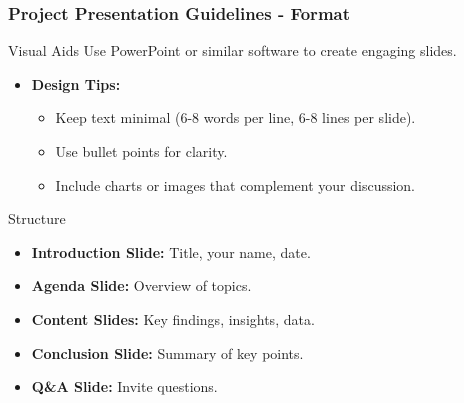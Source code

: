 \documentclass[aspectratio=169]{beamer}
\begin{document}
\begin{frame}[fragile]
    \frametitle{Project Presentation Guidelines - Format}
    \begin{block}{Visual Aids}
        Use PowerPoint or similar software to create engaging slides.
        \begin{itemize}
            \item \textbf{Design Tips:}
                \begin{itemize}
                    \item Keep text minimal (6-8 words per line, 6-8 lines per slide).
                    \item Use bullet points for clarity.
                    \item Include charts or images that complement your discussion.
                \end{itemize}
        \end{itemize}
    \end{block}

    \begin{block}{Structure}
        \begin{itemize}
            \item \textbf{Introduction Slide:} Title, your name, date.
            \item \textbf{Agenda Slide:} Overview of topics.
            \item \textbf{Content Slides:} Key findings, insights, data.
            \item \textbf{Conclusion Slide:} Summary of key points.
            \item \textbf{Q\&A Slide:} Invite questions.
        \end{itemize}
    \end{block}
\end{frame}
\end{document}
